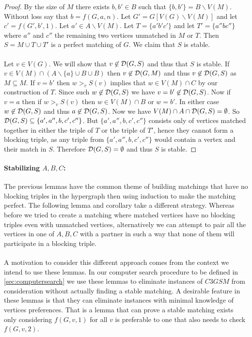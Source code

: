 \begin{proof}
By the size of $M$ there exists $b,b' \in B$ such that $\{b,b'\} = B \backslash V(M)$. Without loss say that $b = f(G, a, n)$. Let $G' = G[V(G)\backslash V(M)]$ and let $c' = f(G',b', 1)$. Let $a' \in A\backslash V(M)$. Let $T = \{a'b'c'\}$ and let $T' = \{a''bc''\}$ where $a''$ and $c''$ the remaining two vertices unmatched in $M$ or $T$. Then $S = M \cup T \cup T'$ is a perfect matching of $G$. We claim that $S$ is stable.
\paragraph{}
Let $v \in V(G)$. We will show that $v \not\in \mathcal{D}(G,S)$ and thus that $S$ is stable. If $v \in V(M) \cap (A\backslash \{a\} \cup B \cup B)$ then $v \not\in \mathcal{D}(G,M)$ and thus $v \not \in \mathcal{D}(G,S)$ as $M \subseteq M$. If $v = b'$ then $w >_v S(v)$ implies that $w \in V(M) \cap C$ by our construction of $T$. Since such $w \not\in \mathcal{D}(G,S)$ we have $v=b' \not\in \mathcal{D}(G,S)$. Now if $v = a$ then if $w>_v S(v)$ then $w \in V(M) \cap B$ or $w = b'$. In either case $w \not\in \mathcal{D}(G,S)$ and thus $a \not \in \mathcal{D}(G,S)$. Now we have $V(M) \cap A \cap \mathcal{D}(G,S) = \emptyset$. So $\mathcal{D}(G,S) \subseteq \{a',a'',b, c',c''\}$. But $\{a',a'',b, c',c''\}$ consists only of vertices matched together in either the triple of $T$ or the triple of $T'$, hence they cannot form a blocking triple, as any triple from $\{a',a'',b, c',c''\}$ would contain a vertex and their match in $S$. Therefore $\mathcal{D}(G,S) = \emptyset$ and thus $S$ is stable.
\end{proof}

\paragraph{Stabilizing $A,B,C$:}
The previous lemmas have the common theme of building matchings that have no blocking triples in the hypergraph then using induction to make the matching perfect. The following lemma and corollary take a different strategy. Whereas before we tried to create a matching where matched vertices have no blocking triples even with unmatched vertices, alternatively we can attempt to pair all the vertices in one of $A,B,C$ with a partner in such a way that none of them will participate in a blocking triple.
\paragraph{}
A motivation to consider this different approach comes from the context we intend to use these lemmas. In our computer search procedure to be defined in \ref{sec:computersearch} we use these lemmas to eliminate instances of $C3GSM$ from consideration without actually finding a stable matching. A desirable feature in these lemmas is that they can eliminate instances with minimal knowledge of vertices preferences. That is a lemma that can prove a stable matching exists only considering $f(G,v,1)$ for all $v$ is preferable to one that also needs to check $f(G,v,2)$.
